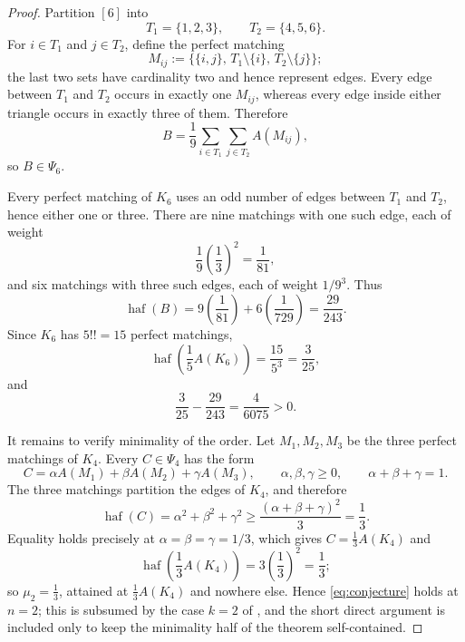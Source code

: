 \documentclass[11pt]{amsart}
\newcommand{\haf}{\operatorname{haf}}
\theoremstyle{remark}
\begin{document}
\begin{proof}
Partition $[6]$ into
\[
  T_1=\{1,2,3\},
  \qquad
  T_2=\{4,5,6\}.
\]
For $i\in T_1$ and $j\in T_2$, define the perfect matching
\[
  M_{ij}:=
  \bigl\{\{i,j\},\,T_1\setminus\{i\},\,T_2\setminus\{j\}\bigr\};
\]
the last two sets have cardinality two and hence represent edges. Every edge
between $T_1$ and $T_2$ occurs in exactly one $M_{ij}$, whereas every edge
inside either triangle occurs in exactly three of them. Therefore
\[
  B=\frac{1}{9}
  \sum_{i\in T_1}\sum_{j\in T_2}A(M_{ij}),
\]
so $B\in\Psi_6$.

Every perfect matching of $K_6$ uses an odd number of edges between $T_1$ and
$T_2$, hence either one or three. There are nine matchings with one such edge,
each of weight
\[
  \frac{1}{9}\left(\frac{1}{3}\right)^2=\frac{1}{81},
\]
and six matchings with three such edges, each of weight $1/9^3$. Thus
\[
  \haf(B)
  =9\left(\frac{1}{81}\right)
   +6\left(\frac{1}{729}\right)
  =\frac{29}{243}.
\]
Since $K_6$ has $5!!=15$ perfect matchings,
\[
  \haf\!\left(\frac{1}{5}A(K_6)\right)
  =\frac{15}{5^3}
  =\frac{3}{25},
\]
and
\[
  \frac{3}{25}-\frac{29}{243}
  =\frac{4}{6075}>0.
\]

It remains to verify minimality of the order. Let $M_1,M_2,M_3$ be the three
perfect matchings of $K_4$. Every $C\in\Psi_4$ has the form
\[
  C=\alpha A(M_1)+\beta A(M_2)+\gamma A(M_3),
  \qquad
  \alpha,\beta,\gamma\ge0,
  \qquad
  \alpha+\beta+\gamma=1.
\]
The three matchings partition the edges of $K_4$, and therefore
\[
  \haf(C)=\alpha^2+\beta^2+\gamma^2
  \ge\frac{(\alpha+\beta+\gamma)^2}{3}
  =\frac{1}{3}.
\]
Equality holds precisely at $\alpha=\beta=\gamma=1/3$, which gives
$C=\frac13A(K_4)$ and
\[
  \haf\!\left(\frac13A(K_4)\right)
  =3\left(\frac13\right)^{2}
  =\frac13 ;
\]
so $\mu_2=\frac13$, attained at $\frac13A(K_4)$ and nowhere else. Hence
\eqref{eq:conjecture} holds at $n=2$; this is subsumed by the case $k=2$ of
\cite[Lemma~3.1]{Friedland2011}, and the short direct argument is included only
to keep the minimality half of the theorem self-contained.
\end{proof}
\end{document}
